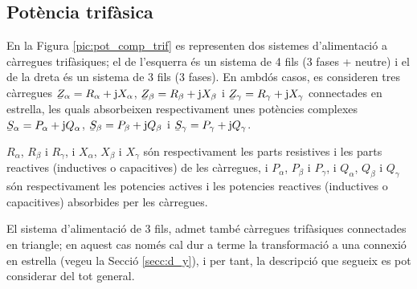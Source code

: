 \subsection{Pot\`{e}ncia trif\`{a}sica} 

En la Figura \vref{pic:pot_comp_trif} es representen dos sistemes
d'alimentaci\'{o} a c\`{a}rregues trif\`{a}siques; el de l'esquerra \'{e}s un
sistema de 4 fils (3 fases + neutre) i el de la dreta \'{e}s un sistema
de 3 fils (3 fases). En ambd\'{o}s casos, es consideren tres c\`{a}rregues
$\cmplx{Z}_\alpha = R_\alpha + \ju X_\alpha$, $\cmplx{Z}_\beta=
R_\beta + \ju X_\beta$ i $\cmplx{Z}_\gamma= R_\gamma + \ju X_\gamma$
connectades en estrella, les quals absorbeixen respectivament unes
pot\`{e}ncies complexes $\cmplx{S}_\alpha= P_\alpha + \ju Q_\alpha$,
$\cmplx{S}_\beta= P_\beta + \ju Q_\beta$ i $\cmplx{S}_\gamma=
P_\gamma + \ju Q_\gamma$.

$R_\alpha$, $R_\beta$ i $R_\gamma$, i $X_\alpha$, $X_\beta$ i
$X_\gamma$ s\'{o}n respectivament les parts resistives i les parts
reactives (inductives o capacitives) de les c\`{a}rregues, i $P_\alpha$,
$P_\beta$ i $P_\gamma$, i $Q_\alpha$, $Q_\beta$ i $Q_\gamma$ s\'{o}n
respectivament les potencies actives i les potencies reactives
(inductives o capacitives) absorbides per les c\`{a}rregues.

El sistema d'alimentaci\'{o} de 3 fils, admet tamb\'{e} c\`{a}rregues
trif\`{a}siques connectades en triangle; en aquest cas nom\'{e}s cal dur a
terme la transformaci\'{o} a una connexi\'{o} en estrella (vegeu la Secci\'{o}
\ref{secc:d_y}), i per tant, la descripci\'{o} que segueix es pot
considerar del tot general.

